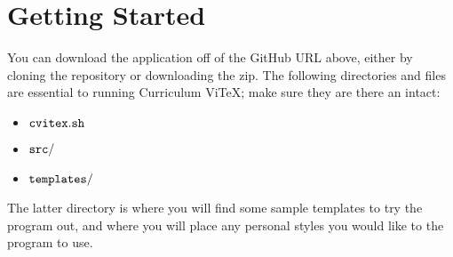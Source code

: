 \documentclass[12pt]{article}
\begin{document}
\section*{Getting Started}
You can download the application off of the GitHub URL above, either by
cloning the repository or downloading the zip. The following directories and
 files are essential to running Curriculum ViTeX; make sure they are there an
intact:
\begin{itemize}
\item $\tt{cvitex.sh}$
\item $\tt{src/}$
\item $\tt{templates/}$
\end{itemize}
The latter directory is where you will find some sample templates to try the
program out, and where you will place any personal styles you would like to
the program to use.
\end{document}
